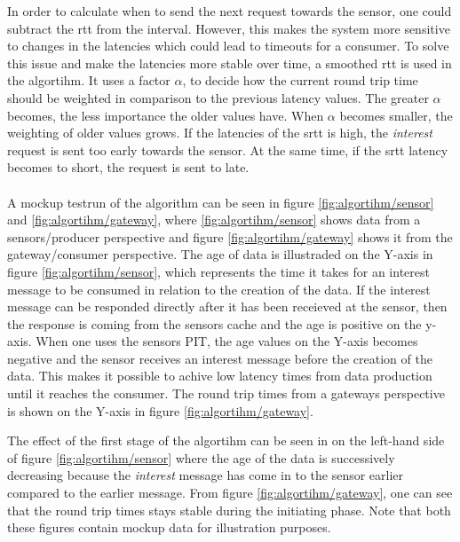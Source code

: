 In order to calculate when to send the next request towards the sensor, one could subtract the rtt from the interval. 
However, this makes the system more sensitive to changes in the latencies which could lead to timeouts for a consumer. To solve this issue and make the latencies more stable over time, a smoothed rtt is used in the algortihm. It uses a factor $\alpha$, to decide how the current round trip time should be weighted in comparison to the previous latency values. The greater $\alpha$ becomes, the less importance the older values have. When $\alpha$ becomes smaller, the weighting of older values grows.
If the latencies of the srtt is high, the \textit{interest} request is sent too early towards the sensor. At the same time, if the srtt latency becomes to short, the request is sent to late.\\\\
A mockup testrun of the algorithm can be seen in figure \ref{fig:algortihm/sensor} and \ref{fig:algortihm/gateway}, where \ref{fig:algortihm/sensor} shows data from a sensors/producer perspective and figure \ref{fig:algortihm/gateway} shows it from the gateway/consumer perspective.
The age of data is illustraded on the Y-axis in figure \ref{fig:algortihm/sensor}, which represents the time it takes for an interest message to be consumed in relation to the creation of the data. If the interest message can be responded directly after it has been receieved at the sensor, then the response is coming from the sensors cache and the age is positive on the y-axis. When one uses the sensors PIT, the age values on the Y-axis becomes negative and the sensor receives an interest message before the creation of the data. This makes it possible to achive low latency times from data production until it reaches the consumer.
The round trip times from a gateways perspective is shown on the Y-axis in figure \ref{fig:algortihm/gateway}. 

The effect of the first stage of the algortihm can be seen in on the left-hand side of figure \ref{fig:algortihm/sensor} where the age of the data is successively decreasing because the \textit{interest} message has come in to the sensor earlier compared to the earlier message. From figure \ref{fig:algortihm/gateway}, one can see that the round trip times stays stable during the initiating phase. Note that both these figures contain mockup data for illustration purposes.

